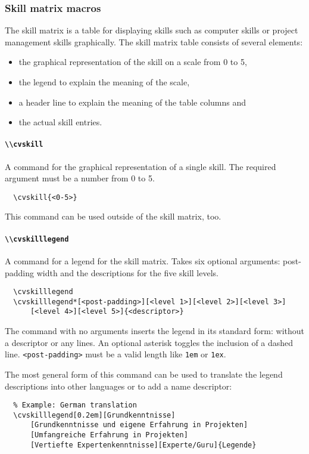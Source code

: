 \documentclass[a4paper, 11pt]{article}
\newcommand{\code}[1]{\lstinline!#1!}
\begin{document}
\subsubsection{Skill matrix macros}
The skill matrix is a table for displaying skills such as computer skills or project management skills graphically.
The skill matrix table consists of several elements:
\begin{itemize}
  \item the graphical representation of the skill on a scale from 0 to 5,
  \item the legend to explain the meaning of the scale,
  \item a header line to explain the meaning of the table columns and
  \item the actual skill entries.
\end{itemize}

\paragraph{\code{\\cvskill}}
A command for the graphical representation of a single skill.
The required argument must be a number from 0 to 5.
\begin{lstlisting}
  \cvskill{<0-5>}
\end{lstlisting}
This command can be used outside of the skill matrix, too.

\paragraph{\code{\\cvskilllegend}}
A command for a legend for the skill matrix.
Takes six optional arguments: post-padding width and the descriptions for the five skill levels.
\begin{lstlisting}
  \cvskilllegend
  \cvskilllegend*[<post-padding>][<level 1>][<level 2>][<level 3>]
      [<level 4>][<level 5>]{<descriptor>}
\end{lstlisting}
The command with no arguments inserts the legend in its standard form: without a descriptor or any lines.
An optional asterisk toggles the inclusion of a dashed line.
\code{<post-padding>} must be a valid length like \code{1em} or \code{1ex}.

The most general form of this command can be used to translate the legend descriptions into other languages or to add a name descriptor:
\begin{lstlisting}
  % Example: German translation
  \cvskilllegend[0.2em][Grundkenntnisse]
      [Grundkenntnisse und eigene Erfahrung in Projekten]
      [Umfangreiche Erfahrung in Projekten]
      [Vertiefte Expertenkenntnisse][Experte/Guru]{Legende}
\end{lstlisting}
\end{document}
